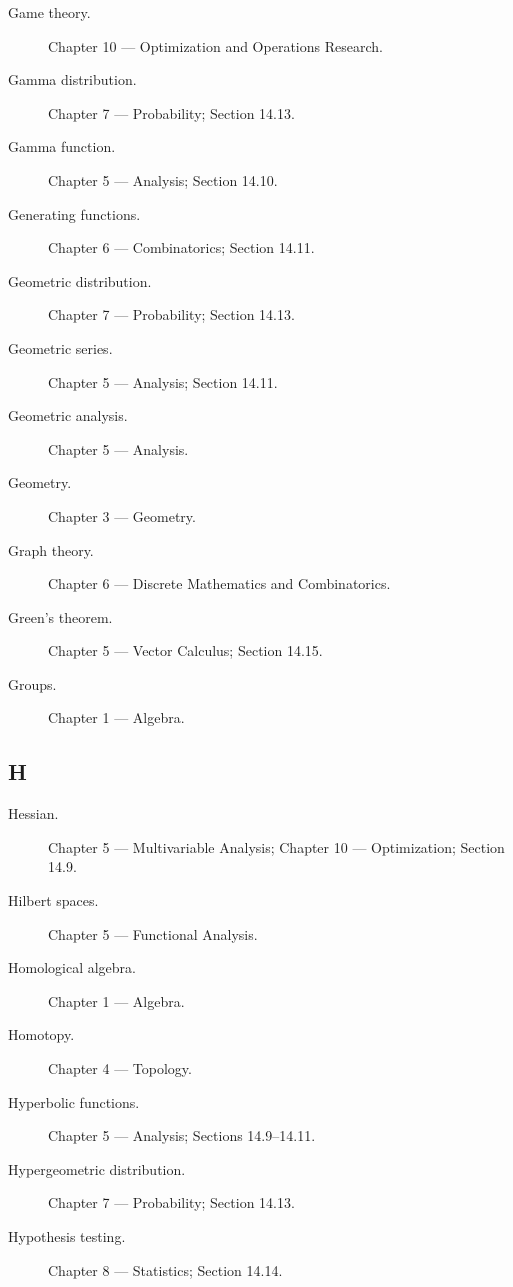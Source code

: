 \begin{description}

\item[Game theory.]
Chapter 10 --- Optimization and Operations Research.

\item[Gamma distribution.]
Chapter 7 --- Probability;
Section 14.13.

\item[Gamma function.]
Chapter 5 --- Analysis;
Section 14.10.

\item[Generating functions.]
Chapter 6 --- Combinatorics;
Section 14.11.

\item[Geometric distribution.]
Chapter 7 --- Probability;
Section 14.13.

\item[Geometric series.]
Chapter 5 --- Analysis;
Section 14.11.

\item[Geometric analysis.]
Chapter 5 --- Analysis.

\item[Geometry.]
Chapter 3 --- Geometry.

\item[Graph theory.]
Chapter 6 --- Discrete Mathematics and Combinatorics.

\item[Green's theorem.]
Chapter 5 --- Vector Calculus;
Section 14.15.

\item[Groups.]
Chapter 1 --- Algebra.

\end{description}

\subsection*{H}

\begin{description}

\item[Hessian.]
Chapter 5 --- Multivariable Analysis;
Chapter 10 --- Optimization;
Section 14.9.

\item[Hilbert spaces.]
Chapter 5 --- Functional Analysis.

\item[Homological algebra.]
Chapter 1 --- Algebra.

\item[Homotopy.]
Chapter 4 --- Topology.

\item[Hyperbolic functions.]
Chapter 5 --- Analysis;
Sections 14.9--14.11.

\item[Hypergeometric distribution.]
Chapter 7 --- Probability;
Section 14.13.

\item[Hypothesis testing.]
Chapter 8 --- Statistics;
Section 14.14.

\end{description}

